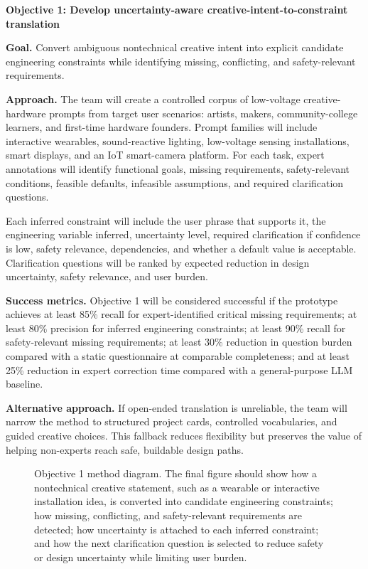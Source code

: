 \textbf{Objective 1: Develop uncertainty-aware creative-intent-to-constraint translation}

\textbf{Goal.} Convert ambiguous nontechnical creative intent into explicit candidate engineering constraints while identifying missing, conflicting, and safety-relevant requirements.

\textbf{Approach.} The team will create a controlled corpus of low-voltage creative-hardware prompts from target user scenarios: artists, makers, community-college learners, and first-time hardware founders. Prompt families will include interactive wearables, sound-reactive lighting, low-voltage sensing installations, smart displays, and an IoT smart-camera platform. For each task, expert annotations will identify functional goals, missing requirements, safety-relevant conditions, feasible defaults, infeasible assumptions, and required clarification questions.

Each inferred constraint will include the user phrase that supports it, the engineering variable inferred, uncertainty level, required clarification if confidence is low, safety relevance, dependencies, and whether a default value is acceptable. Clarification questions will be ranked by expected reduction in design uncertainty, safety relevance, and user burden.

\textbf{Success metrics.} Objective 1 will be considered successful if the prototype achieves at least 85\% recall for expert-identified critical missing requirements; at least 80\% precision for inferred engineering constraints; at least 90\% recall for safety-relevant missing requirements; at least 30\% reduction in question burden compared with a static questionnaire at comparable completeness; and at least 25\% reduction in expert correction time compared with a general-purpose LLM baseline.

\textbf{Alternative approach.} If open-ended translation is unreliable, the team will narrow the method to structured project cards, controlled vocabularies, and guided creative choices. This fallback reduces flexibility but preserves the value of helping non-experts reach safe, buildable design paths.

\begin{figure}[H]
\centering
{}
\caption{Objective 1 method diagram. The final figure should show how a nontechnical creative statement, such as a wearable or interactive installation idea, is converted into candidate engineering constraints; how missing, conflicting, and safety-relevant requirements are detected; how uncertainty is attached to each inferred constraint; and how the next clarification question is selected to reduce safety or design uncertainty while limiting user burden.}
\label{fig:objective1_intent_constraint}
\end{figure}

